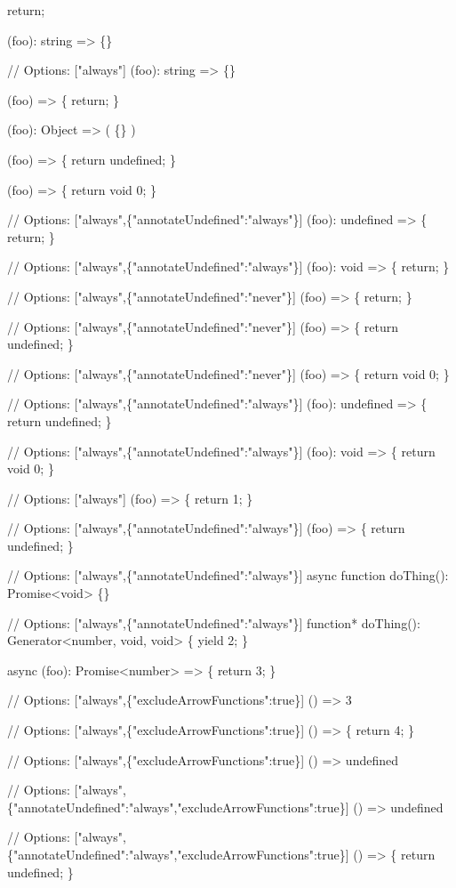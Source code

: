 \begin{DoxyCode}
return;

(foo): string => \{\}

// Options: ["always"]
(foo): string => \{\}

(foo) => \{ return; \}

(foo): Object => ( \{\} )

(foo) => \{ return undefined; \}

(foo) => \{ return void 0; \}

// Options: ["always",\{"annotateUndefined":"always"\}]
(foo): undefined => \{ return; \}

// Options: ["always",\{"annotateUndefined":"always"\}]
(foo): void => \{ return; \}

// Options: ["always",\{"annotateUndefined":"never"\}]
(foo) => \{ return; \}

// Options: ["always",\{"annotateUndefined":"never"\}]
(foo) => \{ return undefined; \}

// Options: ["always",\{"annotateUndefined":"never"\}]
(foo) => \{ return void 0; \}

// Options: ["always",\{"annotateUndefined":"always"\}]
(foo): undefined => \{ return undefined; \}

// Options: ["always",\{"annotateUndefined":"always"\}]
(foo): void => \{ return void 0; \}

// Options: ["always"]
(foo) => \{ return 1; \}

// Options: ["always",\{"annotateUndefined":"always"\}]
(foo) => \{ return undefined; \}

// Options: ["always",\{"annotateUndefined":"always"\}]
async function doThing(): Promise<void> \{\}

// Options: ["always",\{"annotateUndefined":"always"\}]
function* doThing(): Generator<number, void, void> \{ yield 2; \}

async (foo): Promise<number> => \{ return 3; \}

// Options: ["always",\{"excludeArrowFunctions":true\}]
() => 3

// Options: ["always",\{"excludeArrowFunctions":true\}]
() => \{ return 4; \}

// Options: ["always",\{"excludeArrowFunctions":true\}]
() => undefined

// Options: ["always",\{"annotateUndefined":"always","excludeArrowFunctions":true\}]
() => undefined

// Options: ["always",\{"annotateUndefined":"always","excludeArrowFunctions":true\}]
() => \{ return undefined; \}


\end{DoxyCode}
